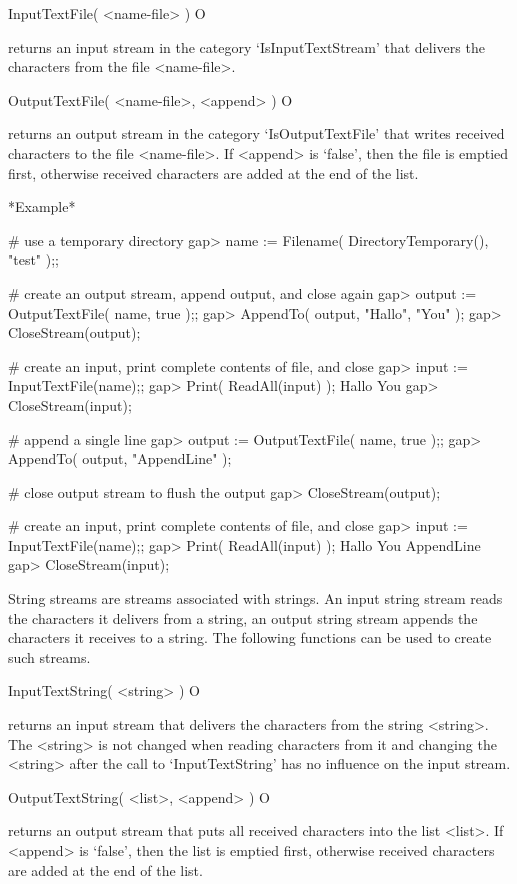 \>InputTextFile( <name-file> ) O

returns an input stream in the category `IsInputTextStream' that delivers
the characters from the file <name-file>.

\>OutputTextFile( <name-file>, <append> ) O

returns  an output stream  in the category `IsOutputTextFile' that writes
received characters  to the file   <name-file>.  If <append> is  `false',
then the  file is emptied first,  otherwise received characters are added
at the end of the list.

*Example*

\begintt
# use a temporary directory
gap> name := Filename( DirectoryTemporary(), "test" );;

# create an output stream, append output, and close again
gap> output := OutputTextFile( name, true );;
gap> AppendTo( output, "Hallo\n", "You\n" );
gap> CloseStream(output);

# create an input, print complete contents of file, and close
gap> input := InputTextFile(name);;
gap> Print( ReadAll(input) );
Hallo
You
gap> CloseStream(input);

# append a single line
gap> output := OutputTextFile( name, true );; 
gap> AppendTo( output, "AppendLine\n" );

# close output stream to flush the output
gap> CloseStream(output);


# create an input, print complete contents of file, and close
gap> input := InputTextFile(name);;
gap> Print( ReadAll(input) );
Hallo
You
AppendLine
gap> CloseStream(input);
\endtt


String streams   are streams associated  with   strings.  An input string
stream reads  the characters it delivers  from a string, an output string
stream  appends the characters  it receives  to  a string.  The following
functions can be used to create such streams.

\>InputTextString( <string> ) O

returns an  input stream that  delivers the  characters  from the  string
<string>.  The  <string> is not changed when  reading characters  from it
and  changing  the <string> after  the  call to `InputTextString'  has no
influence on the input stream.

\>OutputTextString( <list>, <append> ) O

returns an output stream that puts  all received characters into the list
<list>.   If <append>   is  `false',  then  the list   is  emptied first,
otherwise received characters are added at the end of the list.

